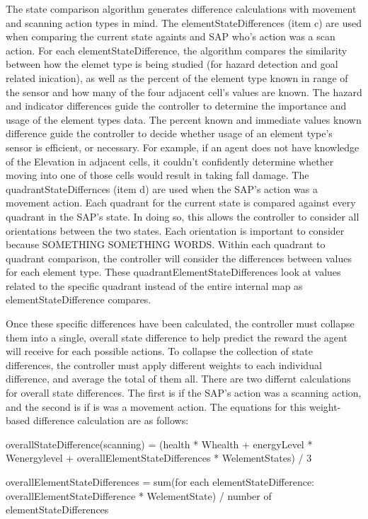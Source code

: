 The state comparison algorithm generates difference calculations with movement and scanning action types in mind.
The elementStateDifferences (item c) are used when comparing the current state againts and SAP who's action was a scan action.
For each elementStateDifference, the algorithm compares the similarity between how the elemet type is being studied (for hazard detection and goal related inication), as well as the percent of the element type known in range of the sensor and how many of the four adjacent cell's values are known.
The hazard and indicator differences guide the controller to determine the importance and usage of the element types data.
The percent known and immediate values known difference guide the controller to decide whether usage of an element type's sensor is efficient, or necessary.
For example, if an agent does not have knowledge of the Elevation in adjacent cells, it couldn't confidently determine whether moving into one of those cells would result in taking fall damage.
The quadrantStateDiffernces (item d) are used when the SAP's action was a movement action.
Each quadrant for the current state is compared against every quadrant in the SAP's state.
In doing so, this allows the controller to consider all orientations between the two states.
Each orientation is important to consider because SOMETHING SOMETHING WORDS.
Within each quadrant to quadrant comparison, the controller will consider the differences between values for each element type.
These quadrantElementStateDifferences look at values related to the specific quadrant instead of the entire internal map as elementStateDifference compares.

Once these specific differences have been calculated, the controller must collapse them into a single, overall state difference to help predict the reward the agent will receive for each possible actions.
To collapse the collection of state differences, the controller must apply different weights to each individual difference, and average the total of them all.
There are two differnt calculations for overall state differences.
The first is if the SAP's action was a scanning action, and the second is if is was a movement action.
The equations for this weight-based difference calculation are as follows:

overallStateDifference(scanning) = (health * Whealth + energyLevel * Wenergylevel + overallElementStateDifferences * WelementStates) / 3

overallElementStateDifferences = sum(for each elementStateDifference: overallElementStateDifference * WelementState) / number of elementStateDifferences

